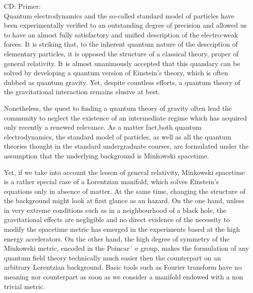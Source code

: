 \documentclass[Main]{subfiles}
\begin{document}
\begin{Warning}
CD: Primer: \\

Quantum electrodynamics and the so-called standard model of particles have been experimentally verified to an outstanding degree of precision and allowed us to have an almost fully satisfactory and unified description of the electro-weak forces. 
It is striking that, to the inherent quantum nature of the description of elementary particles, it is opposed the structure of a classical theory, proper of general relativity. 
It is almost unanimously accepted that this quandary can be solved by developing a quantum version of Einstein’s theory, which is often dubbed as quantum gravity. Yet, despite countless efforts, a quantum theory of the gravitational interaction remains elusive at best.

Nonetheless, the quest to finding a quantum theory of gravity often lead the community to neglect the
existence of an intermediate regime which has acquired only recently a renewed relevance. As a matter fact,both quantum electrodynamics, the standard model of particles, as well as all the quantum theories thought in the standard undergraduate courses, are formulated under the assumption that the underlying background is Minkowski spacetime.

Yet, if we take into account the lesson of general relativity, Minkowski spacetime is a rather special case of a Lorentzian manifold, which solves Einstein’s equations only in absence of matter. At the same time, changing the structure of the background might look at first glance as an hazard. On the one hand, unless in very extreme conditions such as in a neighbourhood of a black hole, the gravitational effects are negligible and no direct evidence of the necessity to modify the spacetime metric has emerged in the experiments based at the high energy accelerators. On the other hand, the high degree of symmetry of the Minkowski metric, encoded in the Poincar´
e group, makes the formulation of any
quantum field theory technically much easier then the counterpart on an arbitrary Lorentzian background. Basic tools such as Fourier transform have no meaning nor counterpart as soon as we consider a manifold endowed with a non trivial metric.


\end{Warning}
\end{document}
